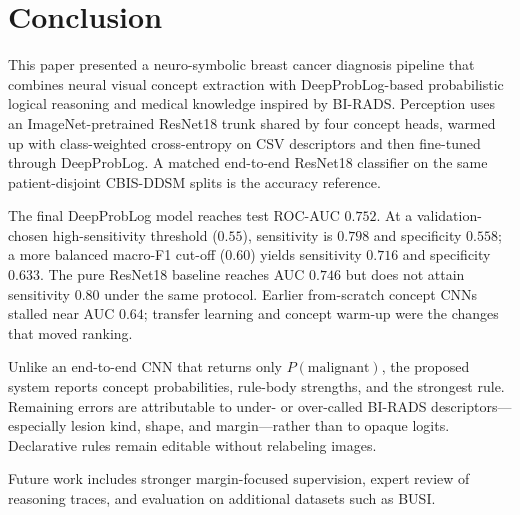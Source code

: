 \section{Conclusion}
\label{sec:conclusion}

This paper presented a neuro-symbolic breast cancer diagnosis pipeline that combines neural visual concept extraction with DeepProbLog-based probabilistic logical reasoning and medical knowledge inspired by BI-RADS. Perception uses an ImageNet-pretrained ResNet18 trunk shared by four concept heads, warmed up with class-weighted cross-entropy on CSV descriptors and then fine-tuned through DeepProbLog. A matched end-to-end ResNet18 classifier on the same patient-disjoint CBIS-DDSM splits is the accuracy reference.

The final DeepProbLog model reaches test ROC-AUC $0.752$. At a validation-chosen high-sensitivity threshold ($0.55$), sensitivity is $0.798$ and specificity $0.558$; a more balanced macro-F1 cut-off ($0.60$) yields sensitivity $0.716$ and specificity $0.633$. The pure ResNet18 baseline reaches AUC $0.746$ but does not attain sensitivity $0.80$ under the same protocol. Earlier from-scratch concept CNNs stalled near AUC $0.64$; transfer learning and concept warm-up were the changes that moved ranking.

Unlike an end-to-end CNN that returns only $P(\mathrm{malignant})$, the proposed system reports concept probabilities, rule-body strengths, and the strongest rule. Remaining errors are attributable to under- or over-called BI-RADS descriptors---especially lesion kind, shape, and margin---rather than to opaque logits. Declarative rules remain editable without relabeling images.

Future work includes stronger margin-focused supervision, expert review of reasoning traces, and evaluation on additional datasets such as BUSI.
